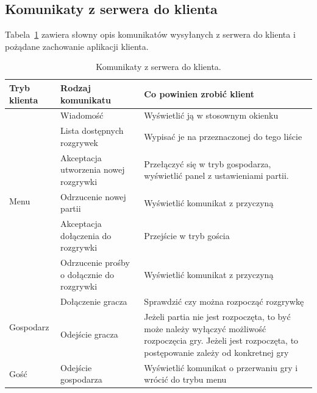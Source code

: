 \documentclass[a4paper, 12pt]{article}
\begin{document}
\subsection{Komunikaty z serwera do klienta}
Tabela~\ref{tab:serdokli} zawiera słowny opis komunikatów wysyłanych z serwera do klienta i pożądane zachowanie aplikacji klienta. 
\begin{table}
\begin{center}
 \begin{tabular}{p{2cm}||p{5.2cm}||p{7cm}}
 \hbox{Tryb} klienta& Rodzaj komunikatu & Co powinien zrobić klient\\ \hline \hline
\multirow{6}{*}{Menu}
  & Wiadomość
  & Wyświetlić ją w stosownym okienku \\ \cline{2-3}

  & Lista dostępnych rozgrywek
  & Wypisać je na przeznaczonej do tego liście \\ \cline{2-3}

  & Akceptacja utworzenia nowej rozgrywki
  & Przełączyć się w tryb gospodarza, wyświetlić panel z ustawieniami partii. \\ \cline{2-3}

  & Odrzucenie nowej partii
  & Wyświetlić komunikat z przyczyną \\ \cline{2-3}

  & Akceptacja dołączenia do rozgrywki 
  & Przejście w tryb gościa \\ \cline{2-3}

  & Odrzucenie prośby o dołącznie do rozgrywki
  & Wyświetlić komunikat z przyczyną \\ \hline \hline

\multirow{2}{*}{Gospodarz}
  & Dołączenie gracza
  & Sprawdzić czy można rozpocząć rozgrywkę \\ \cline{2-3}

  & Odejście gracza
  & Jeżeli partia nie jest rozpoczęta, to być może należy wyłączyć możliwość rozpoczęcia gry. Jeżeli jest rozpoczęta, to postępowanie zależy od konkretnej gry \\ \hline \hline

  Gość
  & Odejście gospodarza
  & Wyświetlić komunikat o przerwaniu gry i wrócić do trybu menu \\ \hline \hline
\end{tabular}
\caption{Komunikaty z serwera do klienta.}
\label{tab:serdokli}
\end{center}
\end{table}
\end{document}
